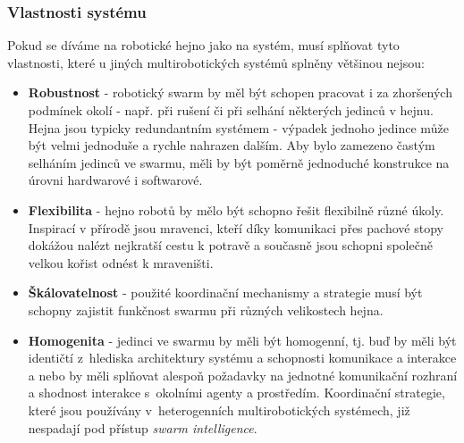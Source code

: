 \documentclass[a4paper,12pt]{article}
\begin{document}
\subsubsection{Vlastnosti systému}
Pokud se díváme na robotické hejno jako na systém, musí splňovat tyto vlastnosti,
které u jiných multirobotických systémů splněny většinou nejsou:
\begin{itemize}
  \item {\bf Robustnost} - robotický swarm by měl být schopen pracovat i za zhoršených
    podmínek okolí - např. při rušení či při selhání některých jedinců v hejnu. Hejna
    jsou typicky redundantním systémem - výpadek jednoho jedince může být velmi jednoduše
    a rychle nahrazen dalším. Aby bylo zamezeno častým selháním jedinců ve swarmu, měli by
    být poměrně jednoduché konstrukce na úrovni hardwarové i softwarové.
  \item {\bf Flexibilita} - hejno robotů by mělo být schopno řešit flexibilně různé úkoly.
    Inspirací v přírodě jsou mravenci, kteří díky komunikaci přes pachové stopy dokážou
    nalézt nejkratší cestu k potravě a současně jsou schopni společně velkou kořist odnést
    k mraveništi.
  \item {\bf Škálovatelnost} - použité koordinační mechanismy a strategie musí být schopny
    zajistit funkčnost swarmu při různých velikostech hejna.
  \item {\bf Homogenita} - jedinci ve swarmu by měli být homogenní, tj. buď by měli
    být identičtí z~hlediska architektury systému a schopnosti komunikace a interakce a
    nebo by měli splňovat alespoň požadavky na jednotné komunikační rozhraní a shodnost
    interakce s~okolními agenty a prostředím. Koordinační strategie, které jsou používány
    v~heterogenních multirobotických systémech, již nespadají pod přístup {\it swarm intelligence}.
\end{itemize}
\end{document}
